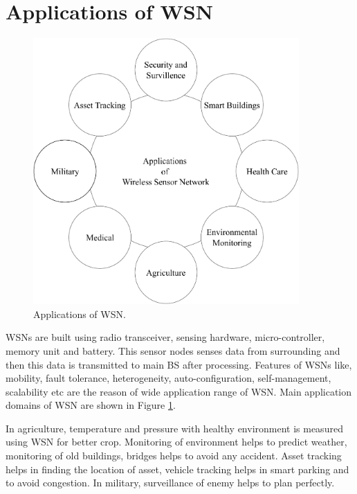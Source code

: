 \section{Applications of WSN}
\begin{figure}[htbp]
\center	
\includegraphics[width=4in, height=4in] {Figures/PDF/WSN-Applications.pdf}	
\caption{Applications of WSN.}
\label{WSN-Applications}	
\end{figure}
\newpage
WSNs are built using radio transceiver, sensing hardware, micro-controller, memory unit and battery. This sensor nodes senses data from surrounding and then this data is transmitted to main BS after processing. Features of WSNs like, mobility, fault tolerance, heterogeneity, auto-configuration, self-management, scalability etc are the reason of wide application range of WSN. Main application domains \cite{ramson2017applications} of WSN are shown in Figure \ref{WSN-Applications}. 
\par In agriculture, temperature and pressure with healthy environment is measured using WSN for better crop. Monitoring of environment helps to predict weather, monitoring of old buildings, bridges helps to avoid any accident. Asset tracking helps in finding the location of asset, vehicle tracking  helps in smart parking and to avoid congestion. In military, surveillance of enemy helps to plan perfectly.

